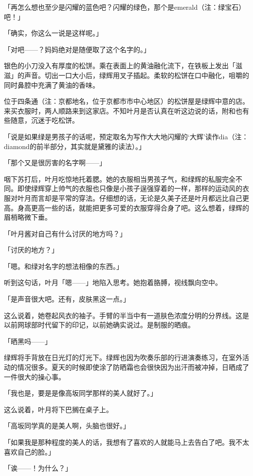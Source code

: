 \documentclass[UTF8]{ctexart}
\begin{document}
    「再怎么想也至少是闪耀的蓝色吧？闪耀的绿色，那个是emerald（注：绿宝石）吧！」

    「确实，你这么一说是这样呢。」

    「对吧——？妈妈绝对是随便取了这个名字的。」

    银色的小刀没入有厚度的松饼。乘在表面上的黄油融化流下，在铁板上发出「滋滋」的声音。切出一口大小后，绿辉用叉子插起。柔软的松饼在口中融化，咀嚼的同时鼻腔中充满了黄油的香味。

    位于四条通（注：京都地名，位于京都市市中心地区）的松饼屋是绿辉中意的店。来买衣服时，两人顺路来到这家店。不知叶月是否认真在听这边说的话，附和也有些随意，沉迷于吃松饼。

    「说是如果绿是男孩子的话呢，预定取名为写作大大地闪耀的‘大辉’读作dia（注：diamond的前半部分，其实就是黛雅的读法）。」

    「那个又是很厉害的名字啊——」

    咽下苏打后，叶月吃惊地托着腮。她的衣服相当男孩子气，和绿辉的私服完全不同。即使绿辉穿上帅气的衣服也只像是小孩子逞强穿着的一样，那样的运动风的衣服对叶月而言却是平常的穿法。仔细想的话，无论是久美子还是叶月都远比自己更高。身高更高一些的话，就能把更多可爱的衣服穿得合身了吧。这么想着，绿辉的眉梢略微下垂。

    「叶月酱对自己有什么讨厌的地方吗？」

    「讨厌的地方？」

    「嗯。和绿对名字的想法相像的东西。」

    听到这句话，叶月「嗯——」地陷入思考。她抱着胳膊，视线飘向空中。

    「是声音很大吧。还有，皮肤黑这一点。」

    这么说着，她卷起风衣的袖子。手臂的半当中有一道肤色浓度分明的分界线。这是以前网球部时代留下的印记，以前她确实说过。是制服的晒痕。

    「晒黑吗——」

    绿辉将手背放在日光灯的灯光下。绿辉也因为吹奏乐部的行进演奏练习，在室外活动的情况很多。夏天的时候即使涂了防晒霜也会很快因为出汗而被冲掉，日晒成了一件很大的操心事。

    「我也是，要是是像高坂同学那样的美人就好了。」

    这么说着，叶月将下巴搁在桌子上。

    「高坂同学真的是美人啊，头脑也很好。」

    「如果我是那种程度的美人的话，我想有了喜欢的人就能马上去告白了吧。我不太喜欢自己的脸。」

    「诶——！为什么？」
\end{document}
